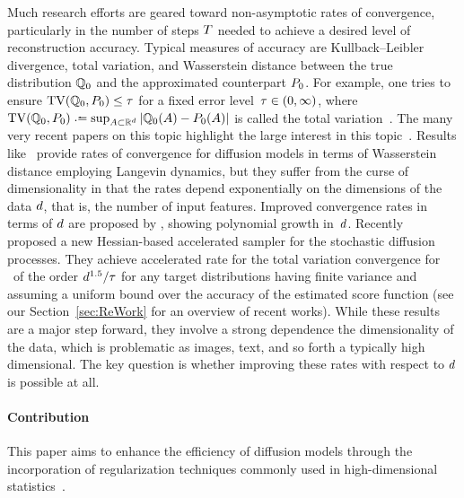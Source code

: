Much research efforts are geared toward non-asymptotic rates of convergence, particularly in the number of steps $\textcolor{black}{T}$ needed to achieve a desired level of reconstruction accuracy.
Typical measures of accuracy are Kullback–Leibler
divergence,  total variation, and Wasserstein distance between the true distribution $\mathbb{Q}_0$ and the approximated counterpart $P_0$. 
For example, one tries to ensure $\operatorname{TV}(\mathbb{Q}_0,P_0)\le \textcolor{black}{\tau}$ for a fixed error level~$\textcolor{black}{\tau}\in (0,\infty)$, where $\TV(\Fd_0,\Bd_0)\deq \sup_{A\subset \R^d}  |\Fd_0(A)-\Bd_0(A)|$ is called the total variation~\citep{Sara2000}.
The many very recent papers on this topic highlight the large interest in this topic~\citep{block2020generative,de2021diffusion,de2022convergence,lee2022convergence,chen2023probability,chen2023improved,li2023towards,chen2023restoration,liang2024nonN}.
Results like~\citet[Theorem~13]{block2020generative} provide rates of convergence for diffusion models in terms of Wasserstein distance employing Langevin dynamics, 
 but they suffer from the curse of dimensionality in that the rates depend exponentially on the dimensions of the data $\textcolor{black}{d}$, that is, the number of input features. 
 Improved convergence rates in terms of $\textcolor{black}{d}$ are proposed by \citet{chen2023probability,li2023towards}, showing polynomial growth in~$\textcolor{black}{d}$. 
Recently~\citet{liang2024nonN} proposed a new Hessian-based accelerated sampler for the stochastic diffusion processes.
They  achieve  accelerated rate  for the total variation convergence for \ddpm\ of the order $\textcolor{black}{d}^{1.5}/\textcolor{black}{\tau}$ for any target distributions having finite variance and  assuming a uniform bound over the accuracy of the estimated score function (see our Section~\ref{sec:ReWork} for an overview of recent works).
 While these results are a major step forward, they involve a strong dependence the dimensionality of the data, which is problematic as images, text, and so forth a typically high dimensional. The key question is whether improving these rates with respect to $\textcolor{black}{d}$ is possible at all.

 \paragraph{Contribution}  
 This paper aims to enhance the efficiency of diffusion models through the incorporation of regularization techniques commonly used in high-dimensional statistics~\cite{Lederer2021HD}.

